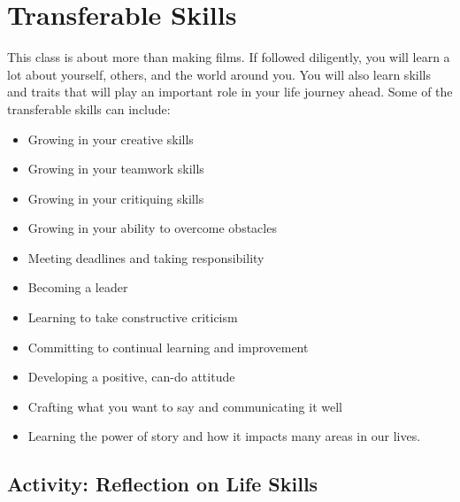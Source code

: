 \documentclass[
  letterpaper,
  DIV=11,
  numbers=noendperiod]{scrreprt}
\providecommand{\tightlist}{%
  \setlength{\itemsep}{0pt}\setlength{\parskip}{0pt}}\usepackage{longtable,booktabs,array}
\begin{document}
\section{Transferable Skills}\label{transferable-skills}

This class is about more than making films. If followed diligently, you
will learn a lot about yourself, others, and the world around you. You
will also learn skills and traits that will play an important role in
your life journey ahead. Some of the transferable skills can include:

\begin{itemize}
\tightlist
\item
  Growing in your creative skills
\item
  Growing in your teamwork skills
\item
  Growing in your critiquing skills
\item
  Growing in your ability to overcome obstacles
\item
  Meeting deadlines and taking responsibility
\item
  Becoming a leader
\item
  Learning to take constructive criticism
\item
  Committing to continual learning and improvement
\item
  Developing a positive, can-do attitude
\item
  Crafting what you want to say and communicating it well
\item
  Learning the power of story and how it impacts many areas in our
  lives.
\end{itemize}

\subsection{Activity: Reflection on Life
Skills}\label{activity-reflection-on-life-skills}
\end{document}

